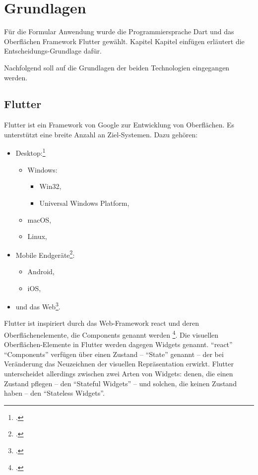 
\section{Grundlagen}

Für die Formular Anwendung wurde die Programmiersprache Dart und das Oberflächen Framework Flutter gewählt.
Kapitel Kapitel einfügen  erläutert die Entscheidungs-Grundlage dafür.

Nachfolgend soll auf die Grundlagen der beiden Technologien eingegangen werden.

\subsection{Flutter}

Flutter ist ein Framework von Google zur Entwicklung von Oberflächen.
Es unterstützt eine breite Anzahl an Ziel-Systemen.
 Dazu gehören:

\begin{itemize}
  \item Desktop:\footcite[Vgl.][]{DesktopSupportForFlutter}
        \begin{itemize}
          \item Windows:
                \begin{itemize}
                  \item Win32,
                  \item Universal Windows Platform,
                \end{itemize}
          \item macOS,
          \item Linux,
        \end{itemize}
  \item Mobile Endgeräte\footcite[Vgl.][]{FlutterBeautifulNativeAppsInRecordTime}:
        \begin{itemize}
          \item Android,
          \item iOS,
        \end{itemize}
  \item und das Web\footcite[Vgl.][]{WebSupportForFlutter}.
\end{itemize}

Flutter ist inspiriert durch das Web-Framework react und deren Oberflächenelemente, die Components genannt werden \footcite[Vgl.][]{IntroductionToWidgets}.
Die visuellen Oberflächen-Elemente in Flutter werden dagegen Widgets genannt.
\enquote{react} \enquote{Components} verfügen über einen Zustand – \enquote{State} genannt – der bei Veränderung das Neuzeichnen der visuellen Repräsentation erwirkt.
Flutter unterscheidet allerdings zwischen zwei Arten von Widgets: denen, die einen Zustand pflegen – den \enquote{Stateful Widgets} – und solchen, die keinen Zustand haben – den \enquote{Stateless Widgets}.

